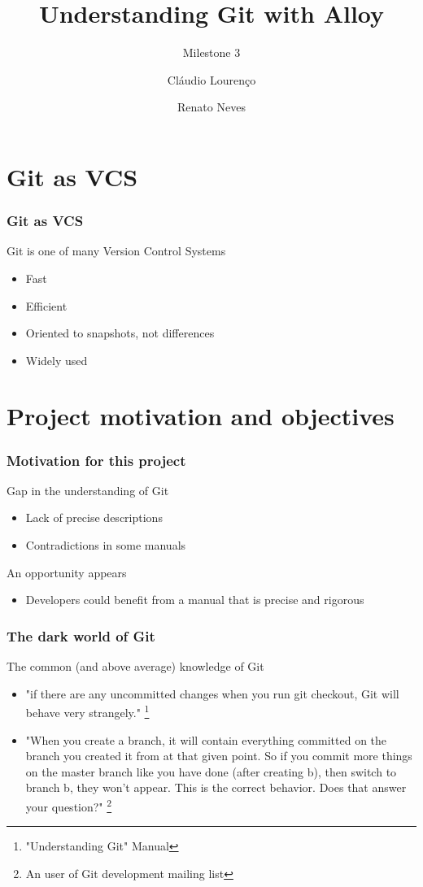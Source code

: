 \documentclass{beamer}
\title{Understanding Git with Alloy}
\subtitle{Milestone 3}
\author{Cláudio Lourenço \and Renato Neves}
\institute{University of Minho\\
Formal Methods in Software Engineering}
\begin{document}
\frame {
   \titlepage
}


\section{Git as VCS}

\begin{frame}
	\frametitle{Git as VCS}
	\begin{block}{Git is one of many Version Control Systems}
		\begin{itemize}
		\item Fast
		\item Efficient
		\item Oriented to snapshots, not differences
		\item Widely used
	\end{itemize}
	\end{block}
\end{frame}

\section{Project motivation and objectives}
\begin{frame}
	\frametitle{Motivation for this project}
	\begin{block}{Gap in the understanding of Git}
		\begin{itemize}
		\item Lack of precise descriptions
		\item Contradictions in some manuals
		\end{itemize}
	\end{block}
	\begin{block}{An opportunity  appears}
	\begin{itemize}
	\item Developers could benefit from a manual
		that is precise and rigorous
	\end{itemize}
	\end{block}
\end{frame}

\begin{frame}
	\frametitle{The dark world of Git}
	\begin{block}{The common (and above average) knowledge of Git }
	\begin{itemize}
	\item "if there are any uncommitted changes when you run git checkout,
	 Git will behave very strangely." \footnote{"Understanding Git" Manual}
	\item "When you create a branch, it will contain everything
         committed on the branch you created it from at that given
         point. So if you commit more things on the master branch like
         you have done (after creating b), then switch to branch b,
         they won't appear. This is the correct behavior. Does that
         answer your question?" \footnote{An user of Git development 
	 mailing list} 
	\end{itemize}
	\end{block}
\end{frame}
\end{document}
